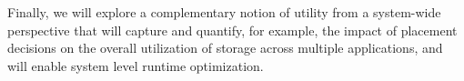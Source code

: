 
 

Finally, we will explore a complementary notion of utility from a system-wide perspective 
that will capture and quantify, for example, the impact of placement decisions on 
the overall utilization of storage across multiple applications, and will enable system level runtime optimization. 


